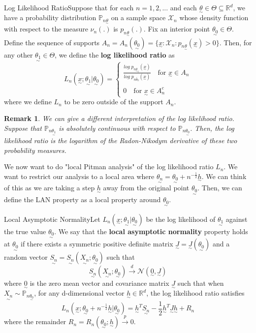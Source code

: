 \documentclass[twoside]{article}
\newtheorem{remark}[theorem]{Remark}
\newcommand{\prob}{\mathbb{P}}
\newcommand{\utilde}{\underset{\sim}}
\begin{document}
\begin{definition_exam}{Log Likelihood Ratio}{}Suppose that for each $n = 1,2,...$ and each $\utilde{\theta} \in \Theta \subseteq \mathbb{R}^d$, we have a probability distribution $\prob_{n \utilde{\theta}}$ on a sample space $\mathcal{X}_n$ whose density function with respect to the measure $\nu_n(.)$ is $p_{n \utilde{\theta}}(.).$ Fix an interior point $\utilde{\theta_0} \in \Theta.$ Define the sequence of supports $A_n = A_n(\utilde{\theta_0}) = \{\utilde{x}: \mathcal{X}_n: p_{n \utilde{\theta}}(\utilde{x}) > 0 \}$. Then, for any other $\utilde{\theta_1} \in \Theta$, we define the \textbf{log likelihood ratio} as 
$$
L_n(\utilde{x}; \utilde{\theta_1}|\utilde{\theta_0}) = 
\begin{cases}
\frac{log\;p_{n \utilde{\theta}_{1}}(\utilde{x}) }{log\;p_{n \tilde{\theta_{0}}}(\utilde{x})} \quad \text{for } \utilde{x} \in A_n\\\\
0 \quad \text{for } \utilde{x} \in A_n^c
\end{cases}
$$
where we define $L_n$ to be zero outside of the support $A_n.$
\end{definition_exam}

\begin{remark}
We can give a different interpretation of the log likelihood ratio. Suppose that $\prob_{n\utilde{\theta_1}}$ is absolutely continuous with respect to $\prob_{n\utilde{\theta_0}}$. Then, the log likelihood ratio is the logarithm of the Radon-Nikodym derivative of these two probability measures.
\end{remark}


We now want to do "local Pitman analysis" of the log likelihood ratio $L_n.$ We want to restrict our analysis to a local area where $\utilde{\theta_n} = \utilde{\theta_0} + n^{-\frac{1}{2}}\utilde{h}.$ We can think of this as we are taking a step $\utilde{h}$ away from the original point $\utilde{\theta_0}$. Then, we can define the LAN property as a local property around $\utilde{\theta_0}.$



\begin{definition_exam}{Local Asymptotic Normality}{}Let $L_n(\utilde{x}; \utilde{\theta_1}|\utilde{\theta_0})$ be the log likelihood of $\utilde{\theta_1}$ against the true value $\utilde{\theta_0}.$ We say that the \textbf{local asymptotic normality} property holds at $\utilde{\theta_0}$ if there exists a symmetric positive definite matrix $\utilde{J} = \utilde{J}(\utilde{\theta_0})$ and a random vector $\utilde{S_n} = \utilde{S_n}(\utilde{X_n}; \utilde{\theta_0})$ such that 
$$
\utilde{S_n}(\utilde{X_n}; \utilde{\theta_0}) \xrightarrow{d} \mathcal{N}(\utilde{0}, \utilde{J})
$$
where $\utilde{0}$ is the zero mean vector and covariance matrix $\utilde{J}$ such that when $\utilde{X_n} \sim \prob_{n \utilde{\theta_0}}$, for any d-dimensional vector $\utilde{h} \in \mathbb{R}^d$, the log likelihood ratio satisfies 
$$
L_n(\utilde{x}; \utilde{\theta_0} + n^{-\frac{1}{2}}\utilde{h}|\utilde{\theta_0}) = \utilde{h}^T\utilde{S_n} - \frac{1}{2}\utilde{h}^T\utilde{J}\utilde{h} + R_n
$$
where the remainder $R_n = R_n(\utilde{\theta_0}; \utilde{h}) \xrightarrow{p} 0.$
\end{definition_exam}
\end{document}
